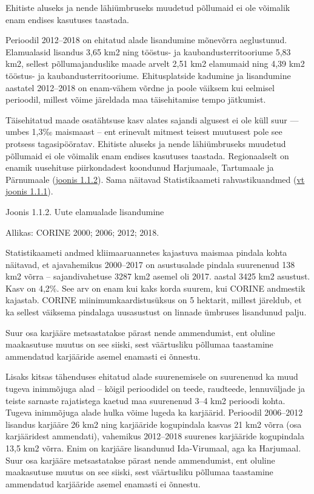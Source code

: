\documentclass[estonian,]{article}
\begin{document}
\begin{blockquote-left}
Ehitiste aluseks ja nende lähiümbruseks muudetud põllumaid ei ole
võimalik enam endises kasutuses taastada.
\end{blockquote-left}

Perioodil 2012--2018 on ehitatud alade lisandumine mõnevõrra aeglustunud. Elamualasid lisandus 3,65 km2 ning tööstus- ja kaubandusterritooriume 5,83 km2, sellest põllumajanduslike maade arvelt 2,51 km2 elamumaid ning 4,39 km2 tööstus- ja kaubandusterritooriume. Ehitusplatside kadumine ja lisandumine aastatel 2012--2018 on enam-vähem võrdne ja poole väiksem kui eelmisel perioodil, millest võime järeldada maa täisehitamise tempo jätkumist.

Täisehitatud maade osatähtsuse kasv alates sajandi algusest ei ole küll suur --- umbes 1,3‰ maismaast -- ent erinevalt mitmest teisest muutusest pole see protsess tagasipööratav. Ehitiste aluseks ja nende lähiümbruseks muudetud põllumaid ei ole võimalik enam endises kasutuses taastada. Regionaalselt on enamik uusehituse piirkondadest koondunud Harjumaale, Tartumaale ja Pärnumaale (\protect\hyperlink{figure112}{joonis 1.1.2}). Sama näitavad Statistikaameti rahvastikuandmed (\protect\hyperlink{figure111}{vt joonis 1.1.1}).

{Joonis 1.1.2.} Uute elamualade lisandumine

\begin{imgsource}
{Allikas:} CORINE 2000; 2006; 2012; 2018.
\end{imgsource}

Statistikaameti andmed kliimaaruannetes kajastuva maismaa pindala kohta näitavad, et ajavahemikus 2000--2017 on asustusalade pindala suurenenud 138 km2 võrra -- sajandivahetuse 3287 km2 asemel oli 2017. aastal 3425 km2 asustust. Kasv on 4,2\%. See arv on enam kui kaks korda suurem, kui CORINE andmestik kajastab. CORINE miinimumkaardistusüksus on 5 hektarit, millest järeldub, et ka sellest väiksema pindalaga uusasustust on linnade ümbruses lisandunud palju.

\begin{blockquote-right}
Suur osa karjääre metsastatakse pärast nende ammendumist, ent oluline
maakasutuse muutus on see siiski, sest väärtusliku põllumaa taastamine
ammendatud karjääride asemel enamasti ei õnnestu.
\end{blockquote-right}

Lisaks kitsas tähenduses ehitatud alade suurenemisele on suurenenud ka muud tugeva inimmõjuga alad -- kõigil perioodidel on teede, raudteede, lennuväljade ja teiste sarnaste rajatistega kaetud maa suurenenud 3--4 km2 perioodi kohta. Tugeva inimmõjuga alade hulka võime lugeda ka karjäärid. Perioodil 2006--2012 lisandus karjääre 26 km2 ning karjääride kogupindala kasvas 21 km2 võrra (osa karjääridest ammendati), vahemikus 2012--2018 suurenes karjääride kogupindala 13,5 km2 võrra. Enim on karjääre lisandunud Ida-Virumaal, aga ka Harjumaal. Suur osa karjääre metsastatakse pärast nende ammendumist, ent oluline maakasutuse muutus on see siiski, sest väärtusliku põllumaa taastamine ammendatud karjääride asemel enamasti ei õnnestu.
\end{document}
